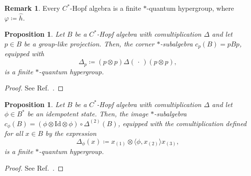 \documentclass[a4paper,10pt]{amsart}
\newcommand{\eval}[2]{\langle #1 , #2\rangle}
\newcommand{\placeholder}{\,\cdot\,}
\newtheorem{proposition}[theorem]{Proposition}
\theoremstyle{definition}
\newtheorem{remark}[theorem]{Remark}
\begin{document}
\begin{remark}
    Every $C^*$-Hopf algebra is a finite $*$-quantum hypergroup, where $\varphi \coloneqq \hat{h}$.
\end{remark}

\begin{proposition}
\label{prop:qHG_1}
Let $B$ be a $C^*$-Hopf algebra with comultiplication $\Delta$ and let $p \in B$ be a group-like projection. Then, the corner $*$-subalgebra $c_p(B) = pBp$, equipped with
    \[
        \Delta_p
            \coloneqq
            (p \otimes p)\Delta(\placeholder)(p \otimes p),
    \]
    is a finite $*$-quantum hypergroup.
\end{proposition}

\begin{proof}
     See Ref.~\cite[Theorem~2.7]{landstad_compact_2007}.
\end{proof}

\begin{proposition}
\label{prop:qHG_2}
Let $B$ be a $C^*$-Hopf algebra with comultiplication $\Delta$ and let $\phi \in B^*$ be an idempotent state. Then, the image $*$-subalgebra $c_\phi(B) = (\phi\otimes \mathrm{Id}\otimes \phi)\circ \Delta^{(2)}(B)$, equipped with the comultiplication defined for all $x\in B$ by the expression
\[
    \Delta_\phi(x)
    \coloneqq
    x_{(1)}\otimes \eval{\phi}{x_{(2)}} x_{(3)},
\]
is a finite $*$-quantum hypergroup.
\end{proposition}

\begin{proof}
    See Ref.~\cite[Theorem~3.17]{landstad_compact_2007}.
\end{proof}
\end{document}
